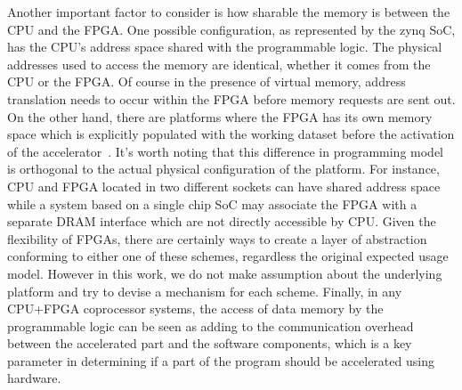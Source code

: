 Another important factor to consider is how sharable the memory
is between the CPU and the FPGA. 
One possible configuration, as represented by the zynq SoC, has
the CPU's address space shared with the programmable logic.
The physical addresses used to access the memory are identical,
whether it comes from the CPU or the FPGA. Of course in the presence
of virtual memory, address translation needs to occur within the FPGA
before memory requests are sent out. On the other hand, there are
platforms where the FPGA has its own memory space which is
explicitly populated with the working dataset before the activation of 
the accelerator~\cite{sdaccel}. It's worth noting that this difference in programming model
is orthogonal to the actual physical configuration of the platform. For instance, CPU and FPGA located in two different sockets can have shared address space while a system based on a single chip SoC may associate the FPGA with a separate DRAM interface which are not directly
accessible by CPU. 
Given the flexibility of FPGAs, there are certainly ways to create a layer of abstraction conforming to either one of these schemes, regardless
the original expected usage model. However in this work, we 
do not make assumption about the underlying platform and try to
 devise a mechanism for each scheme. 
Finally, in any CPU+FPGA coprocessor systems, the access of data memory by the programmable logic can be seen as adding to the communication overhead between the
accelerated part and the software components, which is a key parameter
in determining if a part of the program should be accelerated using hardware.



